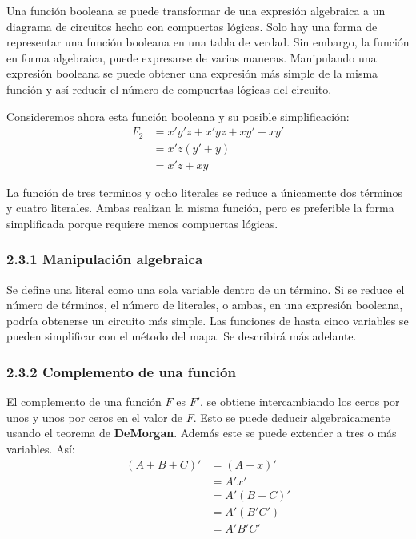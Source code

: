 Una funci\'{o}n booleana se puede transformar de una expresi\'{o}n algebraica a
un diagrama de circuitos hecho con compuertas l\'{o}gicas. Solo hay una forma de
representar una funci\'{o}n booleana en una tabla de verdad. Sin embargo, la
funci\'{o}n en forma algebraica, puede expresarse de varias maneras. Manipulando
una expresi\'{o}n booleana se puede obtener una expresi\'{o}n m\'{a}s simple de
la misma funci\'{o}n y as\'{i} reducir el n\'{u}mero de compuertas l\'{o}gicas
del circuito.

\newpage
Consideremos ahora esta funci\'{o}n booleana y su posible
simplificaci\'{o}n:
\begin{align*}
    F_2 & = x'y'z + x'yz + xy' + xy' \\
        & = x'z(y'  + y)             \\
        & = x'z + xy
\end{align*}

La funci\'{o}n de tres terminos y ocho literales se reduce a \'{u}nicamente dos
t\'{e}rminos y cuatro literales. Ambas realizan la misma funci\'{o}n, pero es
preferible la forma simplificada porque requiere menos compuertas l\'{o}gicas.

\subsubsection*{2.3.1 Manipulaci\'{o}n algebraica}
Se define una literal como una sola variable dentro de un t\'{e}rmino. Si se reduce el
n\'{u}mero de t\'{e}rminos, el n\'{u}mero de literales, o ambas, en una expresi\'{o}n booleana,
podr\'{i}a obtenerse un circuito m\'{a}s simple. Las funciones de hasta cinco variables se pueden
simplificar con el m\'{e}todo del mapa. Se describir\'{a} m\'{a}s adelante.

\subsubsection*{2.3.2 Complemento de una funci\'{o}n}
El complemento de una funci\'{o}n $F$ es $F'$, se obtiene intercambiando los ceros por unos
y unos por ceros en el valor de $F$. Esto se puede deducir algebraicamente usando el teorema
de \textbf{DeMorgan}. Adem\'{a}s este se puede extender a tres o m\'{a}s variables. As\'{i}:
\begin{align*}
    (A + B + C)' & = (A + x)'    \\
                 & = A'x'        \\
                 & =  A'(B + C)' \\
                 & = A'(B'C')    \\
                 & = A'B'C'
\end{align*}
\medbreak

